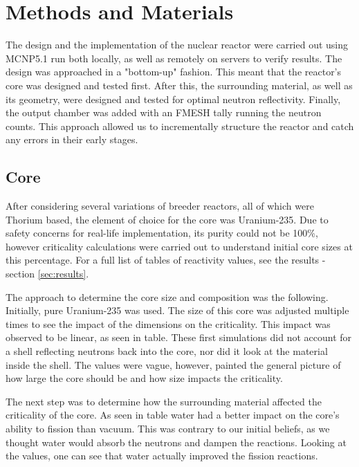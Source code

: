 \label{sec:methods}
\section{Methods and Materials}

The design and the implementation of the nuclear reactor were carried out using MCNP5.1 run both locally, as well as remotely on servers to verify results. The design was approached in a "bottom-up" fashion. This meant that the reactor's core was designed and tested first. After this, the surrounding material, as well as its geometry, were designed and tested for optimal neutron reflectivity. Finally, the output chamber was added with an FMESH tally running the neutron counts. This approach allowed us to incrementally structure the reactor and catch any errors in their early stages.\\

\subsection{Core}

After considering several variations of breeder reactors, all of which were Thorium based, the element of choice for the core was Uranium-235. Due to safety concerns for real-life implementation, its purity could not be 100\%, however criticality calculations were carried out to understand initial core sizes at this percentage. For a full list of tables of reactivity values, see the results - section \ref{sec:results}.

The approach to determine the core size and composition was the following. Initially, pure Uranium-235 was used. The size of this core was adjusted multiple times to see the impact of the dimensions on the criticality. This impact was observed to be linear, as seen in table.%
These first simulations did not account for a shell reflecting neutrons back into the core, nor did it look at the material inside the shell. The values were vague, however, painted the general picture of how large the core should be and how size impacts the criticality.

The next step was to determine how the surrounding material affected the criticality of the core. As seen in table %
water had a better impact on the core's ability to fission than vacuum. This was contrary to our initial beliefs, as we thought water would absorb the neutrons and dampen the reactions. Looking at the values, one can see that water actually improved the fission reactions.

